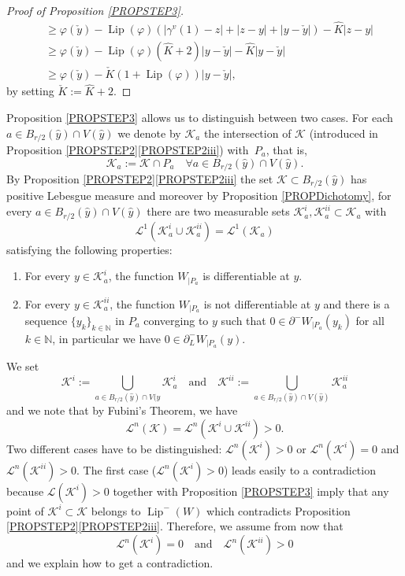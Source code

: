 \documentclass[JEP,XML,SOM,Unicode,NoFloatCountersInSection,published]{cedram}
\newenvironment{enumeratei}
{\bgroup\def\theenumi{\roman{enumi}}\def\theenumii{\arabic{enumii}}\begin{enumerate}}
{\end{enumerate}\egroup}
\DeclareMathOperator{\Lip}{Lip}
\newcommand\N{\mathbb N}
\theoremstyle{definition}
\begin{document}
\begin{proof}[Proof of Proposition \ref{PROPSTEP3}]
\begin{align*}
& \geq  \varphi \left(\check{y}\right) - \Lip(\varphi)\left(\left|\gamma^v(1)-z\right| + \left|z-y\right| + \left|y-\check{y}\right| \right)- \hat{K} \left| z-y\right|\\
& \geq  \varphi \left(\check{y}\right) - \Lip(\varphi)(\hat{K}+2) \left|y-\check{y}\right|- \hat{K} \left|y-\check{y}\right|\\
& \geq  \varphi \left(\check{y}\right) - \check{K} \left(1+\Lip(\varphi) \right) |y-\check{y}|,
\end{align*}
by setting $\check{K}:=\hat{K}+2$.
\end{proof}

Proposition \ref{PROPSTEP3} allows us to distinguish between two cases. For each $a\in B_{r/2}(\hat{y})\cap V(\hat{y})$ we denote by $\mathcal{K}_a$ the intersection of $\mathcal{K}$ (introduced in Proposition \ref{PROPSTEP2}\eqref{PROPSTEP2iii}) with~$P_a$, that is,
\[
\mathcal{K}_a := \mathcal{K} \cap P_a \quad \forall a\in B_{r/2}(\hat{y})\cap V(\hat{y}).
\]
By Proposition \ref{PROPSTEP2}\eqref{PROPSTEP2iii} the set $\mathcal{K}\subset B_{r/2}(\hat{y})$ has positive Lebesgue measure and moreover by Proposition \ref{PROPDichotomy}, for every $a\in B_{r/2}(\hat{y})\cap V(\hat{y})$ there are two measurable sets $\mathcal{K}_{a}^{i}, \mathcal{K}_{a}^{ii} \subset \mathcal{K}_{a}$ with
\[
\mathcal{L}^1 \left(\mathcal{K}_{a}^{i}\cup \mathcal{K}_{a}^{ii}\right) = \mathcal{L}^1\left(\mathcal{K}_{a}\right)
\]
satisfying the following properties:
\begin{enumeratei}
\item\label{enum:i}
For every $y\in \mathcal{K}_{a}^{i}$, the function $W_{|P_a}$ is differentiable at $y$.
\item\label{enum:ii}
For every $y \in \mathcal{K}_{a}^{ii}$, the function $W_{|P_a}$ is not differentiable at $y$ and there is a sequence $\{y_k\}_{k\in \N}$ in $P_a$ converging to $y$ such that $0\in \partial^-W_{|P_a}(y_k)$ for all $k\in \N$, in particular we have $0\in \partial^-_L W_{|P_a}(y)$.
\end{enumeratei}
We set
\[
\mathcal{K}^{i}:= \bigcup_{a\in B_{r/2}(\hat{y})\cap V(\hat{y}} \mathcal{K}_{a}^{i} \quad \text{and} \quad \mathcal{K}^{ii}:= \bigcup_{a\in B_{r/2}(\hat{y})\cap V(\hat{y})} \mathcal{K}_{a}^{ii}
\]
and we note that by Fubini's Theorem, we have
\[
\mathcal{L}^n (\mathcal{K})= \mathcal{L}^n\left(\mathcal{K}^{i}\cup \mathcal{K}^{ii}\right) >0.
\]
Two different cases have to be distinguished: $ \mathcal{L}^n(\mathcal{K}^{i})>0$ or $ \mathcal{L}^n(\mathcal{K}^{i})=0$ and $ \mathcal{L}^n(\mathcal{K}^{ii})>0$. The first case ($\mathcal{L}^n(\mathcal{K}^{i})>0$) leads easily to a contradiction because $\mathcal{L}(\mathcal{K}^{i})>0$ together with Proposition \ref{PROPSTEP3} imply that any point of $\mathcal{K}^{i}\subset \mathcal{K}$ belongs to $\Lip^-(W)$ which contradicts Proposition \ref{PROPSTEP2}\eqref{PROPSTEP2iii}. Therefore, we assume from now that
\[
\mathcal{L}^n(\mathcal{K}^{i})=0 \quad \text{and} \quad \mathcal{L}^n(\mathcal{K}^{ii})>0
\]
and we explain how to get a contradiction. 
\end{document}
